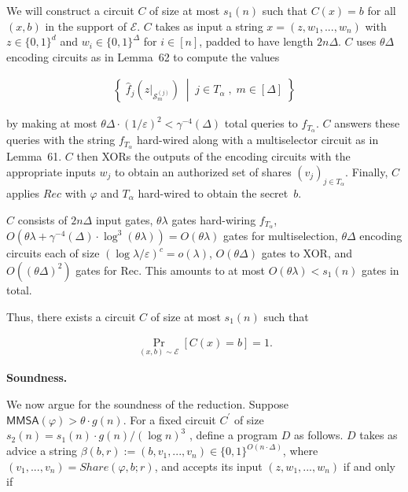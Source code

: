 \documentclass[10pt,a4paper]{article}
\begin{document}
We will construct a circuit $C$ of size at most $s_{1}(n)$ such that $C(x)=b$ for all $(x,b)$ in the support of $\mathcal{E}$. $C$ takes as input a string $x=(z,w_{1},...,w_{n})$ with $z\in\{0,1\}^{d}$ and $w_{i}\in\{0,1\}^{\Delta}$ for $i\in[n]$, padded to have length $2n\Delta$. $C$ uses $\theta\Delta$ encoding circuits as in Lemma 62 to compute the values\par


\[\begin{gathered}
\left\{\;\hat{f}_{j}\left(z|_{\mathcal{S}^{(j)}_{m}}\right)\;\middle|\;j\in T_{\alpha}\;,\;m\in[\Delta]\;\right\}
\end{gathered}\]


by making at most $\theta\Delta\cdot(1/\varepsilon)^{2}<\gamma^{-4}(\Delta)$ total queries to $f_{T_{\alpha}}$. $C$ answers these queries with the string $f_{T_{\alpha}}$ hard-wired along with a multiselector circuit as in Lemma 61. $C$ then XORs the outputs of the encoding circuits with the appropriate inputs $w_{j}$ to obtain an authorized set of shares $(v_{j})_{j\in T_{\alpha}}$. Finally, $C$ applies $Rec$ with $\varphi$ and $T_{\alpha}$ hard-wired to obtain the secret $b$.\par




$C$ consists of $2n\Delta$ input gates, $\theta\lambda$ gates hard-wiring $f_{T_{\alpha}}$, $O(\theta\lambda+\gamma^{-4}(\Delta)\cdot\log^{3}(\theta\lambda))=O(\theta\lambda)$ gates for multiselection, $\theta\Delta$ encoding circuits each of size $(\log\lambda/\varepsilon)^{c}=o(\lambda)$, $O(\theta\Delta)$ gates to XOR, and $O((\theta\Delta)^{2})$ gates for Rec. This amounts to at most $O(\theta\lambda)<s_{1}(n)$ gates in total.\par




Thus, there exists a circuit $C$ of size at most $s_{1}(n)$ such that\par


\[\begin{gathered}
\Pr_{(x,b)\sim\mathcal{E}}[C(x)=b]=1.
\end{gathered}\]





\par\medskip\noindent\textbf{Soundness.}\par




We now argue for the soundness of the reduction. Suppose ${\mathsf{MMSA}}(\varphi)>\theta\cdot g(n)$.
For a fixed circuit $C^{\prime}$ of size $s_{2}(n)=s_{1}(n)\cdot g(n)/(\log n)^{3}$ , define a program $D$ as follows. $D$ takes as advice a string $\beta(b,r):=(b,v_{1},...,v_{n})\in\{0,1\}^{O(n\cdot\Delta)}$, where $(v_{1},...,v_{n})=Share(\varphi,b;r)$, and accepts its input $(z,w_{1},...,w_{n})$ if and only if\par
\end{document}

